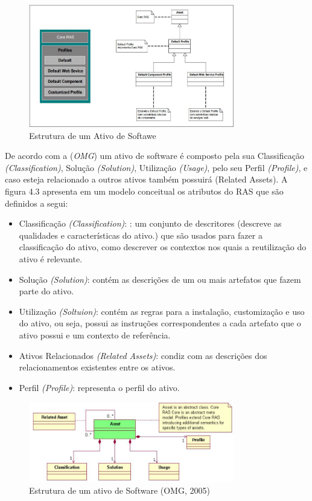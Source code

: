 \begin{figure}[H]
\includegraphics[width=0.8\textwidth]{images/estruturaAsset}
\centering
\caption{Estrutura de um Ativo de Softawe \cite{dissertacaoHenriqueFaria2005}}
\label{Rotulo}
\end{figure}

 De acordo com a (\textit{OMG}) um ativo de software é composto pela sua Classificação \textit{(Classification)}, Solução \textit{(Solution)}, Utilização \textit{(Usage)}, pelo seu Perfil \textit{(Profile)}, e caso esteja relacionado a outros ativos também possuirá (Related Assets). A figura 4.3 apresenta em um modelo conceitual os atributos do RAS que são definidos a segui:

\begin{itemize}
    \item Classificação \textit{(Classification)}: : um conjunto de descritores (descreve as qualidades e características do ativo.) que são usados para fazer a classificação do ativo, como descrever os contextos nos quais a reutilização do ativo é relevante.
     \item Solução \textit{(Solution)}: contém as descrições de um ou mais artefatos que fazem parte do ativo.
     \item Utilização \textit{(Soltuion)}: contém as regras para a instalação, customização e uso do ativo, ou seja, possui as instruções correspondentes a cada artefato que o ativo possui e um contexto de referência.
     \item Ativos Relacionados \textit{(Related Assets)}: condiz com as descrições dos relacionamentos existentes entre os ativos.
     \item Perfil \textit{(Profile)}: representa o perfil do ativo.
\end{itemize}

\begin{figure}[H]
\includegraphics[width=0.8\textwidth]{images/modeloAsset}
\centering
\caption{ Estrutura de um ativo de Software (OMG, 2005)}
\label{Rotulo}
\end{figure}



